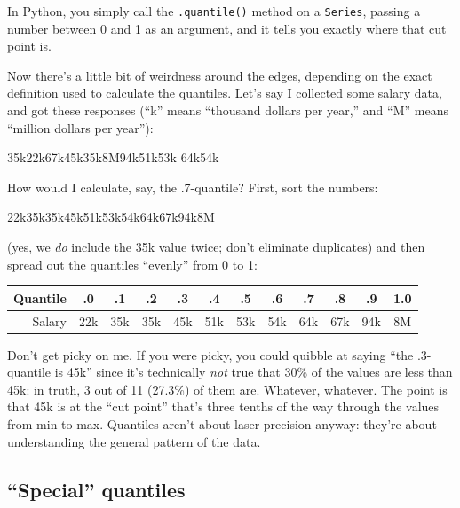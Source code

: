 In Python, you simply call the \texttt{.quantile()} method on a
\texttt{Series}, passing a number between 0 and 1 as an argument, and it tells
you exactly where that cut point is.

Now there's a little bit of weirdness around the edges, depending on the exact
definition used to calculate the quantiles. Let's say I collected some salary
data, and got these responses (``k'' means ``thousand dollars per year,'' and
``M'' means ``million dollars per year''):

\begin{center}
35k\quad 22k\quad 67k\quad 45k\quad 35k\quad 8M\quad 94k\quad 51k\quad 53k\quad
64k\quad 54k
\end{center}

How would I calculate, say, the .7-quantile? First, sort the numbers:

\begin{center}
22k\quad 35k\quad 35k\quad 45k\quad 51k\quad 53k\quad 54k\quad 64k\quad 67k\quad 94k\quad 8M
\end{center}

(yes, we \textit{do} include the 35k value twice; don't eliminate duplicates)
and then spread out the quantiles ``evenly'' from 0 to 1:

\begin{center}
\CBCodeSmall
\setlength{\tabcolsep}{3pt}
\renewcommand{\arraystretch}{1.1}
\begingroup
\par\tagpdfparaOff
{}
\begin{tabular}{rccccccccccc}
Quantile & .0 & .1 & .2 & .3 & .4 & .5 & .6 & .7 & .8 & .9 & 1.0 \\
\hline
Salary & 22k & 35k & 35k & 45k & 51k & 53k & 54k & 64k & 67k & 94k & 8M \\
\end{tabular}\par
\endgroup
\end{center}

Don't get picky on me. If you were picky, you could quibble at saying ``the
.3-quantile is 45k'' since it's technically \textit{not} true that 30\% of the
values are less than 45k: in truth, 3 out of 11 (27.3\%) of them are. Whatever,
whatever. The point is that 45k is at the ``cut point'' that's
three tenths of the way through the values from min to max. Quantiles
aren't about laser precision anyway: they're about understanding the general
pattern of the data.

\subsection{``Special'' quantiles}

